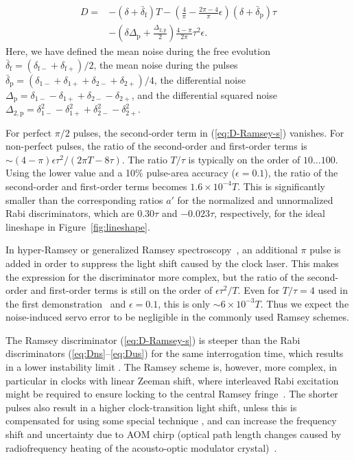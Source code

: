 \documentclass[10pt,a4paper]{iopart}
\newcommand{\eqref}[1]{(\ref{#1})}
\begin{document}
\begin{eqnarray}
D = & -\left( \delta + \bar{\delta}_\mathrm{f} \right) T %
 - \left(\frac{4}{\pi} - \frac{2\pi-4}{\pi}\epsilon\right) \left( \delta + \bar{\delta}_\mathrm{p} \right) \tau \nonumber \\
& - \left( \delta \Delta_\mathrm{p} + \frac{\Delta_{2,\mathrm{p}}}{2} \right) \frac{4-\pi}{2\pi} \tau^2 \epsilon. \label{eq:D-Ramsey-s}
\end{eqnarray}
Here, we have defined the mean noise during the free evolution $\bar{\delta}_\mathrm{f} = (\delta_{\mathrm{f}-} + \delta_{\mathrm{f}+})/2$, the mean noise during the pulses $\bar{\delta}_\mathrm{p} = (\delta_{1-}+\delta_{1+}+\delta_{2-}+\delta_{2+})/4$, the differential noise $\Delta_\mathrm{p} = \delta_{1-}-\delta_{1+}+\delta_{2-}-\delta_{2+}$, and the differential squared noise $\Delta_{2,\mathrm{p}} = \delta_{1-}^2-\delta_{1+}^2+\delta_{2-}^2-\delta_{2+}^2$.

For perfect $\pi/2$ pulses, the second-order term in \eqref{eq:D-Ramsey-s} vanishes. For non-perfect pulses, the ratio of the second-order and first-order terms is ${\sim} (4-\pi) \epsilon\tau^2 /(2\pi T -8 \tau)$. The ratio $T/\tau$ is typically on the order of $10\ldots100$. Using the lower value and a 10\% pulse-area accuracy ($\epsilon=0.1$), the ratio of the second-order and first-order terms becomes $1.6\times 10^{-4} T$. This is significantly smaller than the corresponding ratios $a'$ for the normalized and unnormalized Rabi discriminators, which are $0.30 \tau$ and $-0.023 \tau$, respectively, for the ideal lineshape in Figure~\ref{fig:lineshape}.

In hyper-Ramsey or generalized Ramsey spectroscopy~\cite{Yudin2010a,Huntemann2012b}, an additional $\pi$ pulse is added in order to suppress the light shift caused by the clock laser. This makes the expression for the discriminator more complex, but the ratio of the second-order and first-order terms is still on the order of $\epsilon\tau^2 /T$. Even for $T/\tau = 4$ used in the first demonstration~\cite{Huntemann2012b} and $\epsilon=0.1$, this is only ${\sim}6\times 10^{-3} T$. Thus we expect the noise-induced servo error to be negligible in the commonly used Ramsey schemes.

The Ramsey discriminator \eqref{eq:D-Ramsey-s} is steeper than the Rabi discriminators (\ref{eq:Dns}--\ref{eq:Dus}) for the same interrogation time, which results in a lower instability limit \cite{Peik2006a}. The Ramsey scheme is, however, more complex, in particular in clocks with linear Zeeman shift, where interleaved Rabi excitation might be required to ensure locking to the central Ramsey fringe~\cite{Zhang2020c}. The shorter pulses also result in a higher clock-transition light shift, unless this is compensated for using some special technique \cite{Yudin2010a,Huntemann2012b,Sanner2018a}, and can increase the frequency shift and uncertainty due to AOM chirp (optical path length changes caused by radiofrequency heating of the acousto-optic modulator crystal)~\cite{Kazda2016a}.
\end{document}
